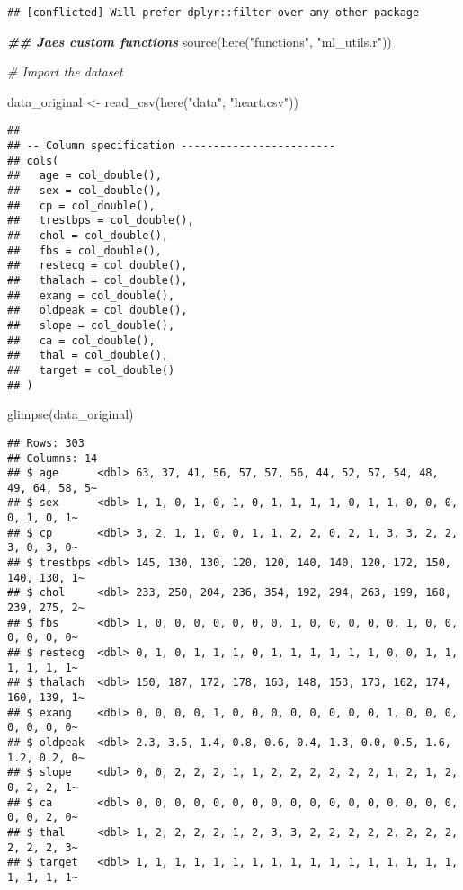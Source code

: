 \documentclass[
]{book}
\newenvironment{Shaded}{\begin{snugshade}}{\end{snugshade}}
\newcommand{\CommentTok}[1]{\textcolor[rgb]{0.56,0.35,0.01}{\textit{#1}}}
\newcommand{\DocumentationTok}[1]{\textcolor[rgb]{0.56,0.35,0.01}{\textbf{\textit{#1}}}}
\newcommand{\FunctionTok}[1]{\textcolor[rgb]{0.00,0.00,0.00}{#1}}
\newcommand{\NormalTok}[1]{#1}
\newcommand{\OtherTok}[1]{\textcolor[rgb]{0.56,0.35,0.01}{#1}}
\newcommand{\StringTok}[1]{\textcolor[rgb]{0.31,0.60,0.02}{#1}}
\begin{document}
\begin{verbatim}
## [conflicted] Will prefer dplyr::filter over any other package
\end{verbatim}

\begin{Shaded}
\begin{Highlighting}[]
\DocumentationTok{\#\# Jae\textquotesingle{}s custom functions }
\FunctionTok{source}\NormalTok{(}\FunctionTok{here}\NormalTok{(}\StringTok{"functions"}\NormalTok{, }\StringTok{"ml\_utils.r"}\NormalTok{))}

\CommentTok{\# Import the dataset }

\NormalTok{data\_original }\OtherTok{\textless{}{-}} \FunctionTok{read\_csv}\NormalTok{(}\FunctionTok{here}\NormalTok{(}\StringTok{"data"}\NormalTok{, }\StringTok{"heart.csv"}\NormalTok{))}
\end{Highlighting}
\end{Shaded}

\begin{verbatim}
## 
## -- Column specification ------------------------
## cols(
##   age = col_double(),
##   sex = col_double(),
##   cp = col_double(),
##   trestbps = col_double(),
##   chol = col_double(),
##   fbs = col_double(),
##   restecg = col_double(),
##   thalach = col_double(),
##   exang = col_double(),
##   oldpeak = col_double(),
##   slope = col_double(),
##   ca = col_double(),
##   thal = col_double(),
##   target = col_double()
## )
\end{verbatim}

\begin{Shaded}
\begin{Highlighting}[]
\FunctionTok{glimpse}\NormalTok{(data\_original)}
\end{Highlighting}
\end{Shaded}

\begin{verbatim}
## Rows: 303
## Columns: 14
## $ age      <dbl> 63, 37, 41, 56, 57, 57, 56, 44, 52, 57, 54, 48, 49, 64, 58, 5~
## $ sex      <dbl> 1, 1, 0, 1, 0, 1, 0, 1, 1, 1, 1, 0, 1, 1, 0, 0, 0, 0, 1, 0, 1~
## $ cp       <dbl> 3, 2, 1, 1, 0, 0, 1, 1, 2, 2, 0, 2, 1, 3, 3, 2, 2, 3, 0, 3, 0~
## $ trestbps <dbl> 145, 130, 130, 120, 120, 140, 140, 120, 172, 150, 140, 130, 1~
## $ chol     <dbl> 233, 250, 204, 236, 354, 192, 294, 263, 199, 168, 239, 275, 2~
## $ fbs      <dbl> 1, 0, 0, 0, 0, 0, 0, 0, 1, 0, 0, 0, 0, 0, 1, 0, 0, 0, 0, 0, 0~
## $ restecg  <dbl> 0, 1, 0, 1, 1, 1, 0, 1, 1, 1, 1, 1, 1, 0, 0, 1, 1, 1, 1, 1, 1~
## $ thalach  <dbl> 150, 187, 172, 178, 163, 148, 153, 173, 162, 174, 160, 139, 1~
## $ exang    <dbl> 0, 0, 0, 0, 1, 0, 0, 0, 0, 0, 0, 0, 0, 1, 0, 0, 0, 0, 0, 0, 0~
## $ oldpeak  <dbl> 2.3, 3.5, 1.4, 0.8, 0.6, 0.4, 1.3, 0.0, 0.5, 1.6, 1.2, 0.2, 0~
## $ slope    <dbl> 0, 0, 2, 2, 2, 1, 1, 2, 2, 2, 2, 2, 2, 1, 2, 1, 2, 0, 2, 2, 1~
## $ ca       <dbl> 0, 0, 0, 0, 0, 0, 0, 0, 0, 0, 0, 0, 0, 0, 0, 0, 0, 0, 0, 2, 0~
## $ thal     <dbl> 1, 2, 2, 2, 2, 1, 2, 3, 3, 2, 2, 2, 2, 2, 2, 2, 2, 2, 2, 2, 3~
## $ target   <dbl> 1, 1, 1, 1, 1, 1, 1, 1, 1, 1, 1, 1, 1, 1, 1, 1, 1, 1, 1, 1, 1~
\end{verbatim}
\end{document}
